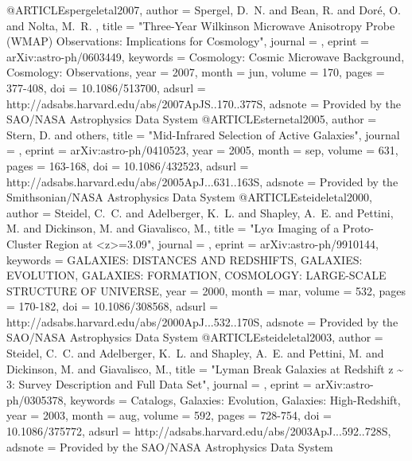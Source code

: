 {{{{{{{{{{{{{{{{{{{{{{{{{{{{{{{{{{{{{{{{{{{{{{{{{{{{{{{@ARTICLE{spergeletal2007,
   author = {{Spergel}, D.~N. and {Bean}, R. and {Dor{\'e}}, O. and {Nolta}, M.~R. }, 
  title = "{Three-Year Wilkinson Microwave Anisotropy Probe (WMAP) Observations: Implications for Cosmology}",
  journal = {\apjs},
   eprint = {arXiv:astro-ph/0603449},
 keywords = {Cosmology: Cosmic Microwave Background, Cosmology: Observations},
     year = 2007,
    month = jun,
   volume = 170,
    pages = {377-408},
      doi = {10.1086/513700},
   adsurl = {http://adsabs.harvard.edu/abs/2007ApJS..170..377S},
  adsnote = {Provided by the SAO/NASA Astrophysics Data System}
}
@ARTICLE{sternetal2005,
   author = {{Stern}, D. and others},
    title = "{Mid-Infrared Selection of Active Galaxies}",
  journal = {\apj},
   eprint = {arXiv:astro-ph/0410523},
     year = 2005,
    month = sep,
   volume = 631,
    pages = {163-168},
      doi = {10.1086/432523},
   adsurl = {http://adsabs.harvard.edu/abs/2005ApJ...631..163S},
  adsnote = {Provided by the Smithsonian/NASA Astrophysics Data System}
}
@ARTICLE{steideletal2000,
   author = {{Steidel}, C.~C. and {Adelberger}, K.~L. and {Shapley}, A.~E. and 
	{Pettini}, M. and {Dickinson}, M. and {Giavalisco}, M.},
    title = "{Ly{$\alpha$} Imaging of a Proto-Cluster Region at <z>=3.09}",
  journal = {\apj},
   eprint = {arXiv:astro-ph/9910144},
 keywords = {GALAXIES: DISTANCES AND REDSHIFTS, GALAXIES: EVOLUTION, GALAXIES: FORMATION, COSMOLOGY: LARGE-SCALE STRUCTURE OF UNIVERSE},
     year = 2000,
    month = mar,
   volume = 532,
    pages = {170-182},
      doi = {10.1086/308568},
   adsurl = {http://adsabs.harvard.edu/abs/2000ApJ...532..170S},
  adsnote = {Provided by the SAO/NASA Astrophysics Data System}
}
@ARTICLE{steideletal2003,
   author = {{Steidel}, C.~C. and {Adelberger}, K.~L. and {Shapley}, A.~E. and 
	{Pettini}, M. and {Dickinson}, M. and {Giavalisco}, M.},
    title = "{Lyman Break Galaxies at Redshift z \~{} 3: Survey Description and Full Data Set}",
  journal = {\apj},
   eprint = {arXiv:astro-ph/0305378},
 keywords = {Catalogs, Galaxies: Evolution, Galaxies: High-Redshift},
     year = 2003,
    month = aug,
   volume = 592,
    pages = {728-754},
      doi = {10.1086/375772},
   adsurl = {http://adsabs.harvard.edu/abs/2003ApJ...592..728S},
  adsnote = {Provided by the SAO/NASA Astrophysics Data System}
}}}}}}}}}}}}}}}}}}}}}}}}}}}}}}}}}}}}}}}}}}}}}}}}}}}}}}}}
